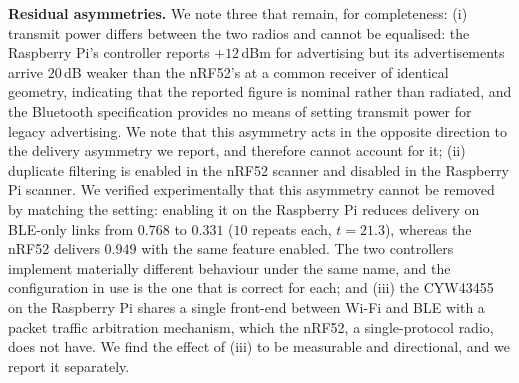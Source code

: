 \textbf{Residual asymmetries.} We note three that remain, for completeness:
(i) transmit power differs between the two radios and cannot be equalised: the
Raspberry Pi's controller reports $+12$\,dBm for advertising but its
advertisements arrive $20$\,dB weaker than the nRF52's at a common receiver of
identical geometry, indicating that the reported figure is nominal rather than
radiated, and the Bluetooth specification provides no means of setting transmit
power for legacy advertising. We note that this asymmetry acts in the opposite
direction to the delivery asymmetry we report, and therefore cannot account for
it; (ii) duplicate filtering is enabled in the nRF52 scanner and disabled in the
Raspberry Pi scanner. We verified experimentally that this asymmetry cannot be
removed by matching the setting: enabling it on the Raspberry Pi reduces delivery
on BLE-only links from $0.768$ to $0.331$ ($10$ repeats each, $t=21.3$), whereas
the nRF52 delivers $0.949$ with the same feature enabled. The two controllers
implement materially different behaviour under the same name, and the
configuration in use is the one that is correct for each; and (iii) the CYW43455 on the Raspberry Pi
shares a single front-end between Wi-Fi and BLE with a packet traffic arbitration
mechanism, which the nRF52, a single-protocol radio, does not have. We find the
effect of (iii) to be measurable and directional, and we report it separately.
